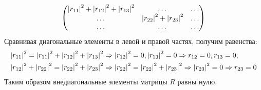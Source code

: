 \begin{example}
\[\begin{pmatrix}
            \left | r_{11} \right |^2 + \left | r_{12} \right |^2 + \left | r_{13} \right |^2 & \dots                                   & \dots \\
            \dots                                                        & \left | r_{22} \right |^2 + \left | r_{23} \right |^2 & \dots \\
            \dots                                                        & \dots                                   & \dots
        \end{pmatrix}
    \]
    Сравнивая диагональные элементы в левой и правой частях, получим равенства:
    \begin{align*}
        \left | r_{11} \right |^2 = \left | r_{11} \right |^2 + \left | r_{12} \right |^2 + \left | r_{13} \right |^2
        & \Rightarrow \left | r_{12} \right |^2 = 0, \left | r_{13} \right |^2 = 0
        \Rightarrow r_{12} = 0, r_{13} = 0 , \\
        \left | r_{12} \right |^2 + \left | r_{22} \right |^2 = \left | r_{22} \right |^2 + \left | r_{23} \right |^2
        & \Rightarrow \left | r_{22} \right |^2 = \left | r_{22} \right |^2 + \left | r_{23} \right |^2
        \Rightarrow \left | r_{23} \right |^2 = 0
        \Rightarrow r_{23} = 0
    \end{align*}
    Таким образом внедиагональные элементы матрицы $R$ равны нулю.
\end{example}

